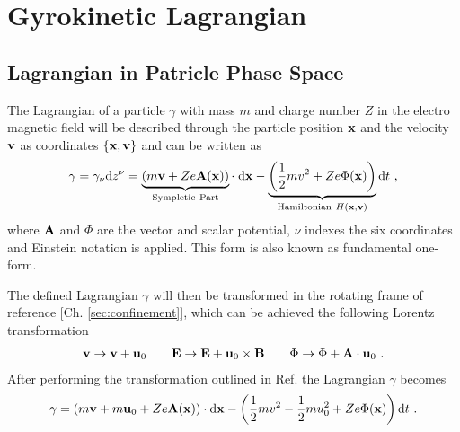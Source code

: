 \newpage
\section{Gyrokinetic Lagrangian}
\label{sec:lagrangian}

\subsection{Lagrangian in Patricle Phase Space}
\label{sub:particleLagrangian}

The Lagrangian of a particle $\gamma$ with mass $m$ and charge number $Z$ in the electro magnetic field will be described through the particle position $\boldsymbol{\mathbf{x}}$ and the velocity $\boldsymbol{\mathbf{v}}$ as coordinates $\{\boldsymbol{\mathbf{x}}, \boldsymbol{\mathbf{v}} \}$ and can be written as
\begin{gather}
    \gamma = \gamma_\nu \mathrm{d}z^\nu = \underbrace{\left(m\boldsymbol{\mathbf{v}} + Ze\boldsymbol{\mathbf{A}}(\boldsymbol{\mathbf{x}}) \right)}_{\mathrm{Sympletic~Part}}\cdot\;\mathrm{d}\boldsymbol{\mathbf{x}} - \underbrace{\left(\frac{1}{2}mv^2 + Ze\Phi(\boldsymbol{\mathbf{x}})\right)}_{\mathrm{Hamiltonian}~H(\boldsymbol{\mathbf{x}},\boldsymbol{\mathbf{v}})} \mathrm{d}t ~,
    \label{eq:particleLagrangian}
\end{gather}
where $\boldsymbol{\mathbf{A}}$ and $\Phi$ are the vector and scalar potential, $\nu$ indexes the six coordinates and Einstein notation is applied. This form is also known as fundamental one-form. \bigskip

The defined Lagrangian $\gamma$ will then be transformed in the rotating frame of reference [Ch. \ref{sec:confinement}], which can be achieved the following Lorentz transformation
\begin{gather}
    \boldsymbol{\mathbf{v}} \rightarrow \boldsymbol{\mathbf{v}} + \boldsymbol{\mathbf{u}}_0 \qquad \boldsymbol{\mathbf{E}} \rightarrow \boldsymbol{\mathbf{E}} + \boldsymbol{\mathbf{u}}_0 \times \boldsymbol{\mathbf{B}} \qquad \Phi \rightarrow \Phi + \boldsymbol{\mathbf{A}} \cdot \boldsymbol{\mathbf{u}}_0 ~.
\end{gather}
After performing the transformation outlined in Ref.  the Lagrangian $\gamma$ becomes
\begin{gather}
    \gamma = \left(m\boldsymbol{\mathbf{v}} + m\boldsymbol{\mathbf{u}}_0 + Ze\boldsymbol{\mathbf{A}}(\boldsymbol{\mathbf{x}}) \right) \cdot \mathrm{d}\boldsymbol{\mathbf{x}} - \left(\frac{1}{2}mv^2 - \frac{1}{2}mu_0^2 + Ze\Phi(\boldsymbol{\mathbf{x}})\right) \mathrm{d}t ~.
    \label{eq:particleLagrangianRot}
\end{gather} 

